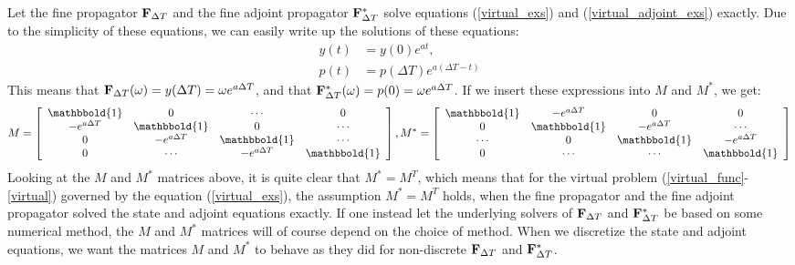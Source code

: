 \\
\\
Let the fine propagator $\bold F_{\Delta T}$ and the fine adjoint propagator $\bold F_{\Delta T}^*$ solve equations (\ref{virtual_exs}) and (\ref{virtual_adjoint_exs}) exactly. Due to the simplicity of these equations, we can easily write up the solutions of these equations:
\begin{align}
y(t)&=y(0)e^{at}, \\
p(t)&=p(\Delta T) e^{a(\Delta T-t)}
\end{align} 
This means that $\bold F_{\Delta T}(\omega)=y(\Delta T)=\omega e^{a\Delta T}$, and that $\bold F_{\Delta T}^*(\omega)=p(0)=\omega e^{a\Delta T}$. If we insert these expressions into $M$ and $M^*$, we get:
\begin{align*}
M = \left[ \begin{array}{cccc}
   \mathbbold{1} & 0 & \cdots & 0 \\  
   -e^{a\Delta T} & \mathbbold{1} & 0 & \cdots \\ 
   0 &-e^{a\Delta T} & \mathbbold{1}  & \cdots \\
   0 &\cdots &-e^{a\Delta T} & \mathbbold{1}  \\
   \end{array}  \right],
M^* =\left[ \begin{array}{cccc}
   	\mathbbold{1} & - e^{a\Delta T} & 0 & 0 \\  
  	 0 & \mathbbold{1} & - e^{a\Delta T} & \cdots \\ 
  	 \cdots &0 &  \mathbbold{1} & - e^{a\Delta T} \\
  	 0 &\cdots &\cdots &  \mathbbold{1}  \\
  	 \end{array}  \right]
\end{align*}
Looking at the $M$ and $M^*$ matrices above, it is quite clear that $M^*=M^T$, which means that for the virtual problem (\ref{virtual_func}-\ref{virtual}) governed by the equation (\ref{virtual_exs}), the assumption $M^*=M^T$ holds, when the fine propagator and the fine adjoint propagator solved the state and adjoint equations exactly. If one instead let the underlying solvers of $\bold F_{\Delta T}$ and $\bold F_{\Delta T}^*$ be based on some numerical method, the $M$ and $M^*$ matrices will of course depend on the choice of method. When we discretize the state and adjoint equations, we want the matrices $M$ and $M^*$ to behave as they did for non-discrete $\bold F_{\Delta T}$ and $\bold F_{\Delta T}^*$.
\\
